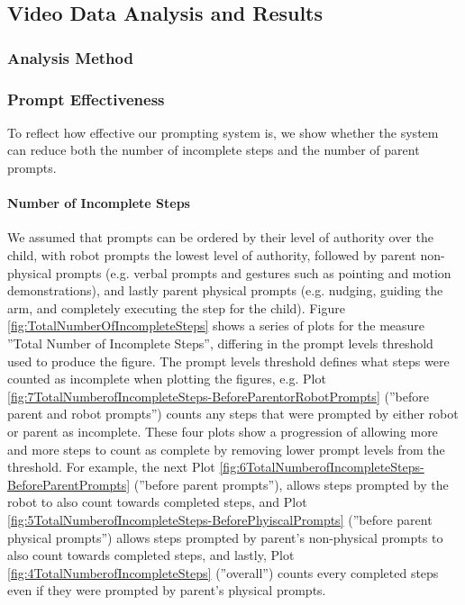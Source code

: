 \subsection{Video Data Analysis and Results}
\label{sec:VideoDataAnalysisAndResults}

\subsubsection{Analysis Method}



\subsubsection{Prompt Effectiveness}
To reflect how effective our prompting system is, we show whether the system can reduce both the number of incomplete steps and the number of parent prompts.

\paragraph{Number of Incomplete Steps}
We assumed that prompts can be ordered by their level of authority over the child, with robot prompts the lowest level of authority, followed by parent non-physical prompts (e.g. verbal prompts and gestures such as pointing and motion demonstrations), and lastly parent physical prompts (e.g. nudging, guiding the arm, and completely executing the step for the child).  Figure \ref{fig:TotalNumberOfIncompleteSteps} shows a series of plots for the measure ''Total Number of Incomplete Steps'', differing in the prompt levels threshold used to produce the figure.  The prompt levels threshold defines what steps were counted as incomplete when plotting the figures, e.g. Plot \ref{fig:7TotalNumberofIncompleteSteps-BeforeParentorRobotPrompts} (''before parent and robot prompts'') counts any steps that were prompted by either robot or parent as incomplete.  These four plots show a progression of allowing more and more steps to count as complete by removing lower prompt levels from the threshold.  For example, the next Plot \ref{fig:6TotalNumberofIncompleteSteps-BeforeParentPrompts} (''before parent prompts''), allows steps prompted by the robot to also count towards completed steps, and Plot \ref{fig:5TotalNumberofIncompleteSteps-BeforePhyiscalPrompts} (''before parent physical prompts'') allows steps prompted by parent's non-physical prompts to also count towards completed steps, and lastly, Plot \ref{fig:4TotalNumberofIncompleteSteps} (''overall'') counts every completed steps even if they were prompted by parent's physical prompts.

